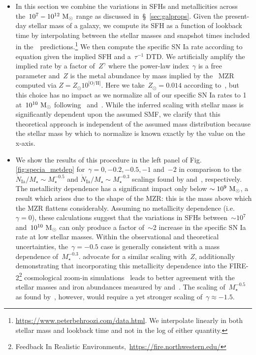 \documentclass[ms.tex]{subfiles}
\begin{document}
\begin{itemize}

	\item In this section we combine the variations in SFHs and metallicities
	across the~$10^7 - 10^{12}~\text{M}_\odot$ range as discussed
	in~\S~\ref{sec:galprops}.
	Given the present-day stellar mass of a galaxy, we compute its SFH as a
	function of lookback time by interpolating between the stellar masses and
	snapshot times included in the~\um~predictions.\footnote{
		\url{https://www.peterbehroozi.com/data.html}. We interpolate linearly
		in both stellar mass and lookback time and not in the log of either
		quantity.
	}
	We then compute the specific SN Ia rate according to equation
	 given the implied SFH and a~$\tau^{-1}$ DTD.
	We artificially amplify the implied rate by a factor of~$Z^{\gamma}$
	where the power-law index~$\gamma$ is a free parameter and~$Z$ is the metal
	abundance by mass implied by the~\citet{Zahid2014} MZR computed via
	$Z = Z_\odot 10^\text{[O/H]}$.
	Here we take~$Z_\odot = 0.014$ according to~\citet{Asplund2009}, but this
	choice has no impact as we normalize all of our specific SN Ia rates to 1
	at~$10^{10}~\text{M}_\odot$ following~\citet{Brown2019} and~\citet{Gandhi2022}.
	While the inferred scaling with stellar mass is significantly dependent
	upon the assumed SMF, we clarify that this theoretical approach is
	independent of the assumed mass distribution because the stellar mass by
	which to normalize is known exactly by the value on the x-axis.

	\item We show the results of this procedure in the left panel of Fig.
	\ref{fig:specia_metdep} for~$\gamma = 0, -0.2, -0.5, -1$ and~$-2$ in
	comparison to the~$\dot{N}_\text{Ia} / M_\star \sim M_\star^{-0.5}$ and
	$\dot{N}_\text{Ia} / M_\star \sim M_\star^{-0.3}$ scalings found by
	\citet{Brown2019} and~\citet{Gandhi2022}, respectively.
	The metallicity dependence has a significant impact only below
	$\sim10^9~\text{M}_\odot$, a result which arises due to the shape of the MZR: this
	is the mass above which the MZR flattens considerably.
	Assuming no metallicity dependence (i.e.~$\gamma = 0$), these calculations
	suggest that the variations in SFHs between~$\sim10^7$ and~$10^{10}~\text{M}_\odot$
	can only produce a factor of~$\sim$2 increase in the specific SN Ia rate
	at low stellar masses.
	Within the observational and theoretical uncertainties, the~$\gamma = -0.5$
	case is generally consistent with a mass dependence of~$M_\star^{-0.3}$.
	\citet{Gandhi2022} advocate for a similar scaling with~$Z$, additionally
	demonstrating that incorporating this metallicity dependence into the
	FIRE-2\footnote{
		Feedback In Realistic Environments,~\url{https://fire.northwestern.edu/}
	}
	cosmological zoom-in simulations~\citep{Hopkins2018} leads to better
	agreement with the stellar masses and iron abundances measured by
	\citet{Gallazzi2005} and~\citet{Kirby2013}.
	The scaling of~$M_\star^{-0.5}$ as found by~\citet{Brown2019}, however,
	would require a yet stronger scaling of~$\gamma \approx -1.5$.


\end{itemize}
\end{document}
